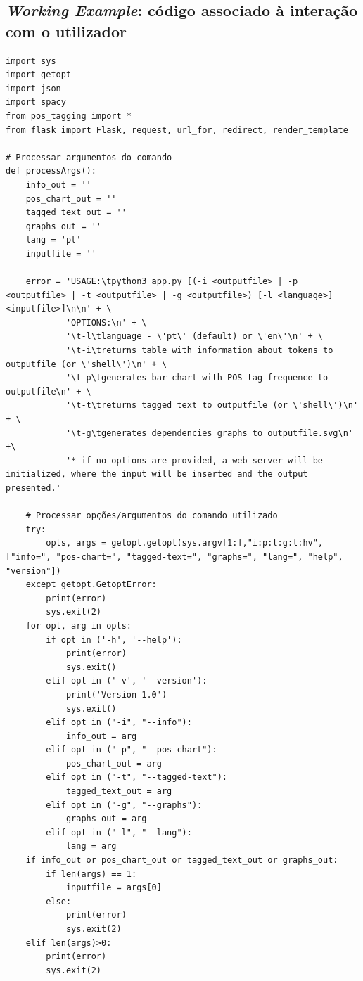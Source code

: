 \documentclass[12pt]{article}
\begin{document}
\subsection{\textit{Working Example}: código associado à interação com o utilizador}
\label{anexo:working_example_2}
\begin{verbatim}
import sys
import getopt
import json
import spacy
from pos_tagging import *
from flask import Flask, request, url_for, redirect, render_template

# Processar argumentos do comando
def processArgs():
    info_out = ''
    pos_chart_out = ''
    tagged_text_out = ''
    graphs_out = ''
    lang = 'pt'
    inputfile = ''

    error = 'USAGE:\tpython3 app.py [(-i <outputfile> | -p <outputfile> | -t <outputfile> | -g <outputfile>) [-l <language>] <inputfile>]\n\n' + \
            'OPTIONS:\n' + \
            '\t-l\tlanguage - \'pt\' (default) or \'en\'\n' + \
            '\t-i\treturns table with information about tokens to outputfile (or \'shell\')\n' + \
            '\t-p\tgenerates bar chart with POS tag frequence to outputfile\n' + \
            '\t-t\treturns tagged text to outputfile (or \'shell\')\n' + \
            '\t-g\tgenerates dependencies graphs to outputfile.svg\n' +\
            '* if no options are provided, a web server will be initialized, where the input will be inserted and the output presented.'

    # Processar opções/argumentos do comando utilizado
    try: 
        opts, args = getopt.getopt(sys.argv[1:],"i:p:t:g:l:hv", ["info=", "pos-chart=", "tagged-text=", "graphs=", "lang=", "help", "version"])
    except getopt.GetoptError:
        print(error)
        sys.exit(2)
    for opt, arg in opts:
        if opt in ('-h', '--help'):
            print(error)
            sys.exit()
        elif opt in ('-v', '--version'):
            print('Version 1.0')
            sys.exit()
        elif opt in ("-i", "--info"):
            info_out = arg
        elif opt in ("-p", "--pos-chart"):
            pos_chart_out = arg
        elif opt in ("-t", "--tagged-text"):
            tagged_text_out = arg
        elif opt in ("-g", "--graphs"):
            graphs_out = arg
        elif opt in ("-l", "--lang"):
            lang = arg
    if info_out or pos_chart_out or tagged_text_out or graphs_out:
        if len(args) == 1:
            inputfile = args[0]
        else:
            print(error)
            sys.exit(2)
    elif len(args)>0:
        print(error)
        sys.exit(2)


\end{verbatim}
\end{document}
